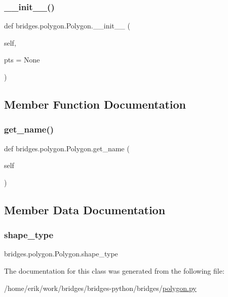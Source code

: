 \subsubsection{\texorpdfstring{\+\_\+\+\_\+init\+\_\+\+\_\+()}{\_\_init\_\_()}}
{\footnotesize\ttfamily def bridges.\+polygon.\+Polygon.\+\_\+\+\_\+init\+\_\+\+\_\+ (\begin{DoxyParamCaption}\item[{}]{self,  }\item[{}]{pts = {\ttfamily None} }\end{DoxyParamCaption})}



\subsection{Member Function Documentation}
\mbox{\label{classbridges_1_1polygon_1_1_polygon_afa0d94f62a19b24ad3764bc900718346}} 
\subsubsection{\texorpdfstring{get\+\_\+name()}{get\_name()}}
{\footnotesize\ttfamily def bridges.\+polygon.\+Polygon.\+get\+\_\+name (\begin{DoxyParamCaption}\item[{}]{self }\end{DoxyParamCaption})}



\subsection{Member Data Documentation}
\mbox{\label{classbridges_1_1polygon_1_1_polygon_ae9c67cb9337ec5deebf1e334e84b3635}} 
\subsubsection{\texorpdfstring{shape\+\_\+type}{shape\_type}}
{\footnotesize\ttfamily bridges.\+polygon.\+Polygon.\+shape\+\_\+type}



The documentation for this class was generated from the following file\+:\begin{DoxyCompactItemize}
\item 
/home/erik/work/bridges/bridges-\/python/bridges/\hyperlink{polygon_8py}{polygon.\+py}\end{DoxyCompactItemize}
